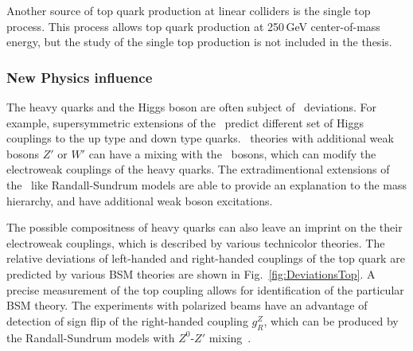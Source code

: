 Another source of top quark production at linear colliders is the single top process. %
This process allows top quark production at 250\,GeV center-of-mass energy, but the study of the single top production is not included in the thesis. 

\subsubsection{New Physics influence}
The heavy quarks and the Higgs boson are often subject of \bsm\ deviations.
For example, supersymmetric extensions of the \sm\ predict different set of Higgs couplings to the up type and down type quarks. 
\bsm\ theories with additional weak bosons $Z'$ or $W'$ can have a mixing with the \sm\ bosons, which can modify the electroweak couplings of the heavy quarks. 
The extradimentional extensions of the \sm\ like Randall-Sundrum models are able to provide an explanation to the mass hierarchy, and have additional weak boson excitations. 

The possible compositness of heavy quarks can also leave an imprint on the their electroweak couplings, which is described by various technicolor theories.
The relative deviations of left-handed and right-handed couplings of the top quark are predicted by various BSM theories are shown in Fig.~\ref{fig:DeviationsTop}.
A precise measurement of the top coupling allows for identification of the particular BSM theory.  
The experiments with polarized beams have an advantage of detection of sign flip of the right-handed coupling $g_R^Z$, which can be produced by the Randall-Sundrum models with $Z^0$-$Z'$ mixing~\cite{bib:RSTOP}.
%

